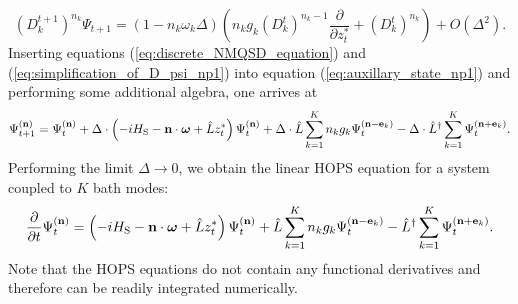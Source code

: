 \begin{equation}
    \label{eq:simplification_of_D_psi_np1}
    \left(D_k^{t+1}\right)^{n_k} \Psi_{t+1} = \left(1-n_k\omega_k\Delta\right)
    \left(n_k g_k \left(D_k^t\right)^{n_k-1}\frac{\partial}{\partial z_t^*} + \left(D_k^t\right)^{n_k}\right) + O\left(\Delta^2\right).
\end{equation}
Inserting equations (\ref{eq:discrete_NMQSD_equation}) and (\ref{eq:simplification_of_D_psi_np1}) into equation (\ref{eq:auxillary_state_np1}) and performing some
additional algebra, one arrives at
\begin{equation*}
    \Psi_{t+1}^{(\vectorbold{n})} = \Psi_t^{(\vectorbold{n})} + \Delta\cdot\left(
        -iH_\text{S} - \vectorbold{n}\cdot\boldsymbol{\omega} + \hat{L}z_t^*
    \right) \Psi_t^{(\vectorbold{n})}
    + \Delta \cdot \hat{L}\sum_{k=1}^{K}n_kg_k\Psi_t^{(\vectorbold{n}-\vectorbold{e}_k)}
    - \Delta \cdot \hat{L}^\dagger\sum_{k=1}^{K}\Psi_t^{(\vectorbold{n}+\vectorbold{e}_k)}.
\end{equation*}
Performing the limit $\Delta \rightarrow 0$, we obtain the linear HOPS equation for a system coupled to $K$ bath modes:
\begin{equation}
    \label{eq:linear_HOPS_single_site}
    \frac{\partial}{\partial t}\Psi_t^{(\vectorbold{n})} = \left(
        -iH_\text{S} - \vectorbold{n}\cdot\boldsymbol{\omega} + \hat{L}z_t^*
    \right) \Psi_t^{(\vectorbold{n})}
    + \hat{L}\sum_{k=1}^{K}n_kg_k\Psi_t^{(\vectorbold{n}-\vectorbold{e}_k)}
    - \hat{L}^\dagger\sum_{k=1}^{K}\Psi_t^{(\vectorbold{n}+\vectorbold{e}_k)}.
\end{equation}
Note that the HOPS equations do not contain any functional derivatives and therefore can be readily integrated numerically.